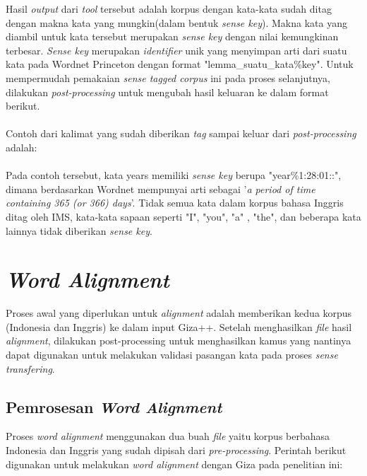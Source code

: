 Hasil \textit{output} dari \textit{tool} tersebut adalah korpus dengan kata-kata sudah ditag dengan makna kata yang mungkin(dalam bentuk \textit{sense key}). Makna kata yang diambil untuk kata tersebut merupakan \textit{sense key} dengan nilai kemungkinan terbesar. \textit{Sense key} merupakan \textit{identifier} unik yang menyimpan arti dari suatu kata pada Wordnet Princeton dengan format "lemma\_suatu\_kata\%key". Untuk mempermudah pemakaian \textit{sense tagged corpus} ini pada proses selanjutnya, dilakukan \textit{post-processing} untuk mengubah hasil keluaran ke dalam format berikut.\\

\noindent{}\\

Contoh dari kalimat yang sudah diberikan \textit{tag} sampai keluar dari \textit{post-processing} adalah:\\

\noindent{}\\

Pada contoh tersebut, kata years memiliki \textit{sense key} berupa "year\%1:28:01::", dimana berdasarkan Wordnet mempunyai arti sebagai '\textit{a period of time containing 365 (or 366) days}'. Tidak semua kata dalam korpus bahasa Inggris ditag oleh IMS, kata-kata sapaan seperti "I", "you", "a" , "the", dan beberapa kata lainnya tidak diberikan \textit{sense key}.  



\section{\textit{Word Alignment}}

Proses awal yang diperlukan untuk \textit{alignment} adalah memberikan kedua korpus (Indonesia dan Inggris) ke dalam input Giza++. Setelah menghasilkan \textit{file} hasil \textit{alignment}, dilakukan post-processing untuk menghasilkan kamus yang nantinya dapat digunakan untuk melakukan validasi pasangan kata pada proses \textit{sense transfering}.

\subsection{Pemrosesan \textit{Word Alignment}}
Proses \textit{word alignment} menggunakan dua buah \textit{file} yaitu korpus berbahasa Indonesia dan Inggris yang sudah dipisah dari \textit{pre-processing}. Perintah berikut digunakan untuk melakukan \textit{word alignment} dengan Giza pada penelitian ini:

